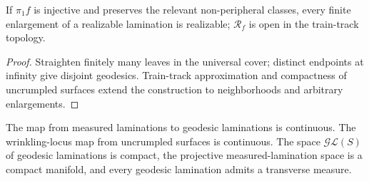 \begin{proposition}
\label{thurston-ch08-realization-openness}
If $\pi_1f$ is injective and preserves the relevant non-peripheral classes, every finite enlargement of a realizable lamination is realizable; $\mathcal R_f$ is open in the train-track topology.
\end{proposition}
\begin{proof}\sketch Straighten finitely many leaves in the universal cover; distinct endpoints at infinity give disjoint geodesics.  Train-track approximation and compactness of uncrumpled surfaces extend the construction to neighborhoods and arbitrary enlargements.\end{proof}

\begin{proposition}
\label{thurston-ch08-lamination-space-topology}
The map from measured laminations to geodesic laminations is continuous.  The wrinkling-locus map from uncrumpled surfaces is continuous.  The space $\mathcal{GL}(S)$ of geodesic laminations is compact, the projective measured-lamination space is a compact manifold, and every geodesic lamination admits a transverse measure.
\end{proposition}

